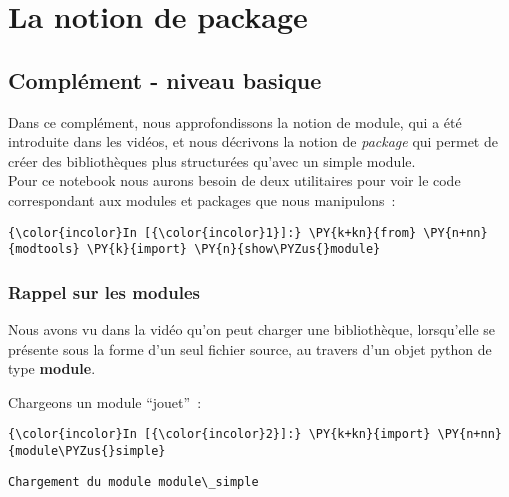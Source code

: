     \hypertarget{la-notion-de-package}{%
\section{La notion de package}\label{la-notion-de-package}}

    \hypertarget{compluxe9ment---niveau-basique}{%
\subsection{Complément - niveau
basique}\label{compluxe9ment---niveau-basique}}

    Dans ce complément, nous approfondissons la notion de module, qui a été
introduite dans les vidéos, et nous décrivons la notion de
\emph{package} qui permet de créer des bibliothèques plus structurées
qu'avec un simple module.\\

    Pour ce notebook nous aurons besoin de deux utilitaires pour voir le
code correspondant aux modules et packages que nous manipulons~:

    \begin{Verbatim}[commandchars=\\\{\}]
{\color{incolor}In [{\color{incolor}1}]:} \PY{k+kn}{from} \PY{n+nn}{modtools} \PY{k}{import} \PY{n}{show\PYZus{}module}
\end{Verbatim}


    \hypertarget{rappel-sur-les-modules}{%
\subsubsection{Rappel sur les modules}\label{rappel-sur-les-modules}}

    Nous avons vu dans la vidéo qu'on peut charger une bibliothèque,
lorsqu'elle se présente sous la forme d'un seul fichier source, au
travers d'un objet python de type \textbf{module}.

    Chargeons un module ``jouet''~:

    \begin{Verbatim}[commandchars=\\\{\}]
{\color{incolor}In [{\color{incolor}2}]:} \PY{k+kn}{import} \PY{n+nn}{module\PYZus{}simple}
\end{Verbatim}


    \begin{Verbatim}[commandchars=\\\{\}]
Chargement du module module\_simple

    \end{Verbatim}

